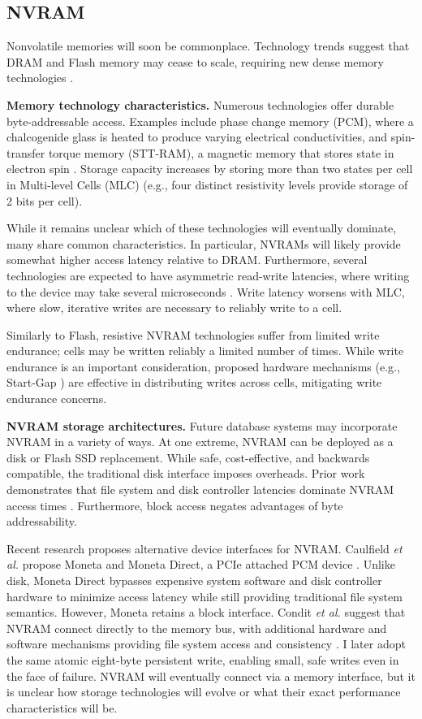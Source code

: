 \subsection{NVRAM}
\label{sec:Background:Storage:NVRAM}

Nonvolatile memories will soon be commonplace.
Technology trends suggest that DRAM and Flash memory may cease to scale, requiring new dense memory technologies \cite{LeeIpek09}.

\textbf{Memory technology characteristics.}
Numerous technologies offer durable byte-addressable access.
Examples include phase change memory (PCM), where a chalcogenide glass is heated to produce varying electrical conductivities, and spin-transfer torque memory (STT-RAM), a magnetic memory that stores state in electron spin \cite{BurrKurdi08}.
Storage capacity increases by storing more than two states per cell in Multi-level Cells (MLC) (e.g., four distinct resistivity levels provide storage of 2 bits per cell).

While it remains unclear which of these technologies will eventually dominate, many share common characteristics.
In particular, NVRAMs will likely provide somewhat higher access latency relative to DRAM.
Furthermore, several technologies are expected to have asymmetric read-write latencies, where writing to the device may take several microseconds \cite{QureshiSrinivasan09}.
Write latency worsens with MLC, where slow, iterative writes are necessary to reliably write to a cell.

Similarly to Flash, resistive NVRAM technologies suffer from limited write endurance; cells may be written reliably a limited number of times.
While write endurance is an important consideration, proposed hardware mechanisms (e.g., Start-Gap \cite{QureshiKaridis09}) are effective in distributing writes across cells, mitigating write endurance concerns.

\textbf{NVRAM storage architectures.}
Future database systems may incorporate NVRAM in a variety of ways.
At one extreme, NVRAM can be deployed as a disk or Flash SSD replacement.
While safe, cost-effective, and backwards compatible, the traditional disk interface imposes overheads.
Prior work demonstrates that file system and disk controller latencies dominate NVRAM access times \cite{CaulfieldDe10}.
Furthermore, block access negates advantages of byte addressability.

Recent research proposes alternative device interfaces for NVRAM.
Caulfield \emph{et al.} propose Moneta and Moneta Direct, a PCIe attached PCM device \cite{CaulfieldMollov12}.
Unlike disk, Moneta Direct bypasses expensive system software and disk controller hardware to minimize access latency while still providing traditional file system semantics.
However, Moneta retains a block interface.
Condit \emph{et al.} suggest that NVRAM connect directly to the memory bus, with additional hardware and software mechanisms providing file system access and consistency \cite{ConditNightingale09}.
I later adopt the same atomic eight-byte persistent write, enabling small, safe writes even in the face of failure.
NVRAM will eventually connect via a memory interface, but it is unclear how storage technologies will evolve or what their exact performance characteristics will be.

